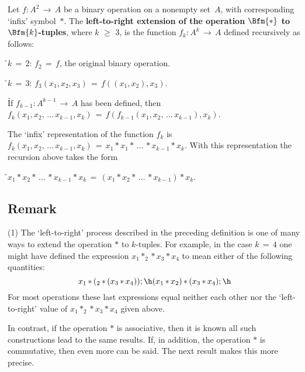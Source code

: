 {        Let $f:A^{2} \,{\rightarrow}\, A$ be a binary operation on a nonempty set~$A$, with corresponding `infix' symbol~${\ast}$.
    The {\bf left-to-right extension of the operation $\Bfm{{\ast}}$ to $\Bfm{k}$-tuples}, where $k\,\,{\geq}\,\,3$, is the function $f_{k}:A^{k} \,{\rightarrow}\, A$ defined recursively as follows:

        \h $k \,=\, 2$: $f_{2} \,=\, f$, the original binary operation.

        \h $k \,=\, 3$: $f_{3}(x_{1}, x_{2}, x_{3}) \,=\, f((x_{1}, x_{2}), x_{3})$.

        \h If $f_{k-1}:A^{k-1} \,{\rightarrow}\, A$ has been defined, then 
    $f_{k}(x_{1}, x_{2}, \,{\ldots}\,x_{k-1}, x_{k}) \,=\, f(f_{k-1}(x_{1}, x_{2}, \,{\ldots}\,x_{k-1}), x_{k})$.

\noindent The `infix' representation of the function $f_{k}$ is
    $f_{k}(x_{1}, x_{2}, \,{\ldots}\,x_{k-1}, x_{k}) \,=\, x_{1}{\ast}x_{1}{\ast}\,{\ldots}\,{\ast}x_{k-1}{\ast}x_{k}$.
    With this representation the recursion above takes the form

        \h $x_{1}{\ast}x_{2}{\ast}\,{\ldots}\,{\ast}x_{k-1}{\ast}x_{k} \,=\, (x_{1}{\ast}x_{2}{\ast}\,{\ldots}\,{\ast}x_{k-1}){\ast} x_{k}$.
                                          
\VV

            \subsection{\small{\bf Remark}}
            \label{RemrkA60.40}

        (1) The `left-to-right' process described in the preceding definition is one of many ways to extend the operation ${\ast}$ to $k$-tuples.
    For example, in the case $k \,=\, 4$ one might have defined the expression $x_{1}{\ast}_{2}{\ast}x_{3}{\ast}x_{4}$ to mean either of the following quantities:
        \begin{displaymath}
        x_{1}\,{\ast}\,(_{2}\,{\ast}\,(x_{3}\,{\ast}\,x_{4})); \h
        (x_{1}\,{\ast}\,x_{2})\,{\ast}\,(x_{3}\,{\ast}\,x_{4}); \h
        \end{displaymath}
    For most operations these last expressions equal neither each other nor the `left-to-right' value of $x_{1}{\ast}_{2}{\ast}x_{3}{\ast}x_{4}$ given above.

        In contrast, if the operation ${\ast}$ is associative, then it is known all such constructions lead to the same results.
    If, in addition, the operation ${\ast}$ is commutative, then even more can be said. The next result makes this more precise.

}
